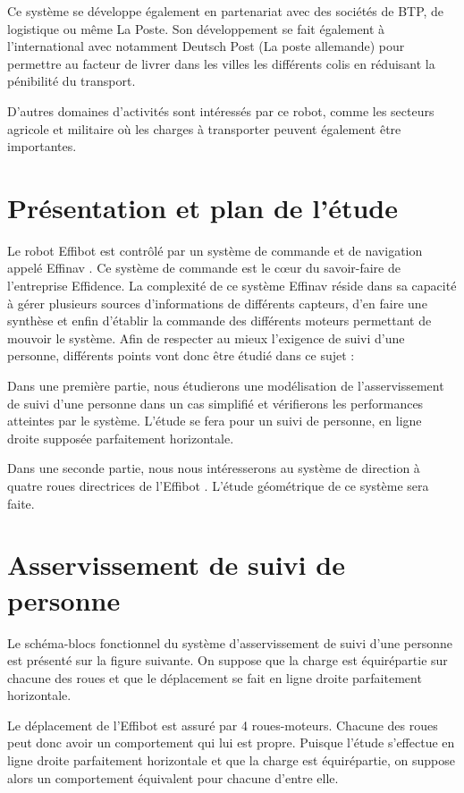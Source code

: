 Ce système se développe également en partenariat avec des sociétés de BTP, de logistique ou même La Poste. Son développement se fait également à l'international avec notamment Deutsch Post (La poste allemande) pour permettre au facteur de livrer dans les villes les différents colis en réduisant la
pénibilité du transport.

D'autres domaines d'activités sont intéressés par ce robot, comme les secteurs agricole et militaire où les charges à transporter peuvent également être importantes.

\section{Présentation et plan de l'étude}

Le robot \og Effibot \fg est contrôlé par un système de commande et de navigation appelé \og Effinav \fg. Ce système de commande est le c\oe ur du savoir-faire de l'entreprise Effidence. La complexité de ce système \og Effinav \fg réside dans sa capacité à gérer plusieurs sources d'informations de différents capteurs, d'en faire une synthèse et enfin d'établir la commande des différents moteurs permettant de mouvoir le système. Afin de respecter au mieux l'exigence de suivi d'une personne, différents points vont donc être étudié dans ce sujet :

Dans une première partie, nous étudierons une modélisation de l'asservissement de suivi d'une personne dans un cas simplifié et vérifierons les performances atteintes par le système. L'étude se fera pour un suivi de personne, en ligne droite supposée parfaitement horizontale.

Dans une seconde partie, nous nous intéresserons au système de direction à quatre roues directrices de l'\og Effibot \fg. L'étude géométrique de ce système sera faite.

\section{Asservissement de suivi de personne}

Le schéma-blocs fonctionnel du système d'asservissement de suivi d'une personne est présenté sur la figure suivante. On suppose que la charge est équirépartie sur chacune des roues et que le déplacement se fait en ligne droite parfaitement horizontale.

Le déplacement de l'\og Effibot \fg est assuré par 4 roues-moteurs. Chacune des roues peut donc avoir un comportement qui lui est propre. Puisque l'étude s'effectue en ligne droite parfaitement horizontale et que la charge est équirépartie, on suppose alors un comportement équivalent pour chacune d'entre elle.

